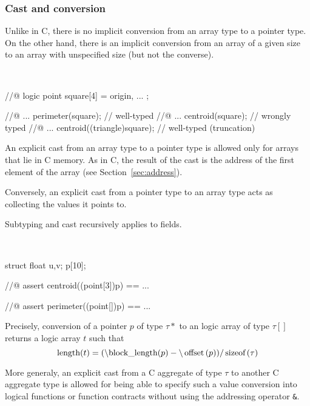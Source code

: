 \subsubsection{Cast and conversion}

Unlike in C, there is no implicit conversion from an array type to a
pointer type. On the other hand, there is an implicit conversion from
an array of a given size to an array with unspecified size (but not
the converse).

\begin{example}
~
\begin{listing-nonumber}
//@ logic point square[4] = { origin, ... };

//@ ... perimeter(square);          // well-typed
//@ ... centroid(square);           // wrongly typed
//@ ... centroid((triangle)square); // well-typed (truncation)
\end{listing-nonumber}
\end{example}

An explicit cast from an array type to a pointer type is allowed only
for arrays that lie in C memory. As in C, the result of the cast is
the address of the first element of the array (see
Section~\ref{sec:address}).

Conversely, an explicit cast from a pointer type to an array type
acts as collecting the values it points to.

Subtyping and cast recursively applies to fields.

\begin{example}
~
\begin{listing-nonumber}
  struct { float u,v; } p[10];

  //@ assert centroid((point[3])p) == ...

  //@ assert perimeter((point[])p) == ...
\end{listing-nonumber}
\end{example}

Precisely, conversion of a pointer $p$ of type $\tau*$ to an logic array of type
$\tau[]$ returns a logic array $t$ such that
\[
\lstinline|length|(t) = (
\blocklength\indexttbs{block\_length}
(p) - 
\lstinline|\offset|
(p))/\lstinline|sizeof|(\tau)
\]

More generaly, an explicit cast from a C aggregate of type $\tau$ to another C 
aggregate type is allowed for being able to specify such a value conversion into logical functions or function contracts without using the addressing operator \lstinline|&|.

